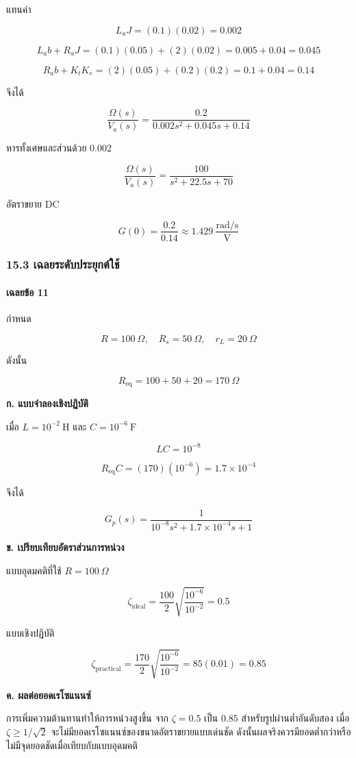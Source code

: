 แทนค่า

\[
L_aJ=(0.1)(0.02)=0.002
\]

\[
L_ab+R_aJ=(0.1)(0.05)+(2)(0.02)
=0.005+0.04=0.045
\]

\[
R_ab+K_tK_e=(2)(0.05)+(0.2)(0.2)
=0.1+0.04=0.14
\]

จึงได้

\[
\boxed{
\frac{\Omega(s)}{V_a(s)}
=
\frac{0.2}{0.002s^2+0.045s+0.14}
}
\]

หารทั้งเศษและส่วนด้วย $0.002$

\[
\boxed{
\frac{\Omega(s)}{V_a(s)}
=
\frac{100}{s^2+22.5s+70}
}
\]

อัตราขยาย DC

\[
G(0)=\frac{0.2}{0.14}
\approx\boxed{1.429\ \frac{\text{rad/s}}{\text{V}}}
\]

\subsubsection{15.3 เฉลยระดับประยุกต์ใช้}

\paragraph{เฉลยข้อ 11}

กำหนด

\[
R=100\ \Omega,\quad
R_s=50\ \Omega,\quad
r_L=20\ \Omega
\]

ดังนั้น

\[
R_{\text{eq}}=100+50+20=170\ \Omega
\]

\textbf{ก. แบบจำลองเชิงปฏิบัติ}

เมื่อ $L=10^{-2}\ \text{H}$ และ $C=10^{-6}\ \text{F}$

\[
LC=10^{-8}
\]

\[
R_{\text{eq}}C=(170)(10^{-6})=1.7\times10^{-4}
\]

จึงได้

\[
\boxed{
G_p(s)
=
\frac{1}{10^{-8}s^2+1.7\times10^{-4}s+1}
}
\]

\textbf{ข. เปรียบเทียบอัตราส่วนการหน่วง}

แบบอุดมคติที่ใช้ $R=100\ \Omega$

\[
\zeta_{\text{ideal}}
=
\frac{100}{2}\sqrt{\frac{10^{-6}}{10^{-2}}}
=0.5
\]

แบบเชิงปฏิบัติ

\[
\zeta_{\text{practical}}
=
\frac{170}{2}\sqrt{\frac{10^{-6}}{10^{-2}}}
=85(0.01)
=\boxed{0.85}
\]

\textbf{ค. ผลต่อยอดเรโซแนนซ์}

การเพิ่มความต้านทานทำให้การหน่วงสูงขึ้น จาก $\zeta=0.5$ เป็น $0.85$ สำหรับรูปผ่านต่ำอันดับสอง เมื่อ $\zeta\geq1/\sqrt{2}$ จะไม่มียอดเรโซแนนซ์ของขนาดอัตราขยายแบบเด่นชัด ดังนั้นผลจริงควรมียอดต่ำกว่าหรือไม่มีจุดยอดชัดเมื่อเทียบกับแบบอุดมคติ

